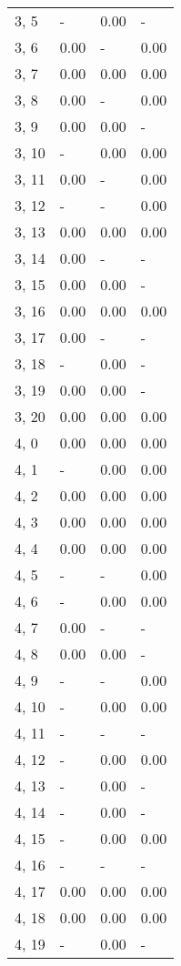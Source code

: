\begin{table}
\begin{tabular}{llll}
3, 5   &     - &  0.00 &     - \\
3, 6   &  0.00 &     - &  0.00 \\
3, 7   &  0.00 &  0.00 &  0.00 \\
3, 8   &  0.00 &     - &  0.00 \\
3, 9   &  0.00 &  0.00 &     - \\
3, 10  &     - &  0.00 &  0.00 \\
3, 11  &  0.00 &     - &  0.00 \\
3, 12  &     - &     - &  0.00 \\
3, 13  &  0.00 &  0.00 &  0.00 \\
3, 14  &  0.00 &     - &     - \\
3, 15  &  0.00 &  0.00 &     - \\
3, 16  &  0.00 &  0.00 &  0.00 \\
3, 17  &  0.00 &     - &     - \\
3, 18  &     - &  0.00 &     - \\
3, 19  &  0.00 &  0.00 &     - \\
3, 20  &  0.00 &  0.00 &  0.00 \\
4, 0   &  0.00 &  0.00 &  0.00 \\
4, 1   &     - &  0.00 &  0.00 \\
4, 2   &  0.00 &  0.00 &  0.00 \\
4, 3   &  0.00 &  0.00 &  0.00 \\
4, 4   &  0.00 &  0.00 &  0.00 \\
4, 5   &     - &     - &  0.00 \\
4, 6   &     - &  0.00 &  0.00 \\
4, 7   &  0.00 &     - &     - \\
4, 8   &  0.00 &  0.00 &     - \\
4, 9   &     - &     - &  0.00 \\
4, 10  &     - &  0.00 &  0.00 \\
4, 11  &     - &     - &     - \\
4, 12  &     - &  0.00 &  0.00 \\
4, 13  &     - &  0.00 &     - \\
4, 14  &     - &  0.00 &     - \\
4, 15  &     - &  0.00 &  0.00 \\
4, 16  &     - &     - &     - \\
4, 17  &  0.00 &  0.00 &  0.00 \\
4, 18  &  0.00 &  0.00 &  0.00 \\
4, 19  &     - &  0.00 &     - \\

\end{tabular}
\end{table}
